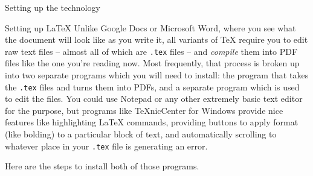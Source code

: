 \documentclass[11pt]{article}
\begin{document}
\begin{section}{Setting up the technology}
\begin{subsection}{Setting up \LaTeX{}}
Unlike Google Docs or Microsoft Word, where you see what the document will look like as you write it, all variants of \TeX{} require you to edit raw text files -- almost all of which are \lstinline{.tex} files -- and \emph{compile} them into PDF files like the one you're reading now.  Most frequently, that process is broken up into two separate programs which you will need to install: the program that takes the \lstinline{.tex} files and turns them into PDFs, and a separate program which is used to edit the files.  You could use Notepad or any other extremely basic text editor for the purpose, but programs like TeXnicCenter for Windows provide nice features like highlighting \LaTeX{} commands, providing buttons to apply format (like bolding) to a particular block of text, and automatically scrolling to whatever place in your \lstinline{.tex} file is generating an error.

Here are the steps to install both of those programs.


\end{subsection}
\end{section}
\end{document}
